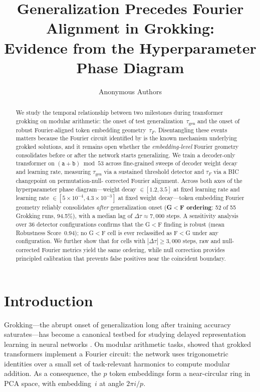 \documentclass{article}
\title{\textbf{Generalization Precedes Fourier Alignment in Grokking:\\
Evidence from the Hyperparameter Phase Diagram}}
\author{Anonymous Authors}
\date{}
\newcommand{\taug}{\tau_{\mathrm{gen}}}
\newcommand{\tauf}{\tau_{F}}
\newcommand{\Dtau}{\Delta\tau}
\begin{document}
\maketitle

\begin{abstract}
We study the temporal relationship between two milestones during
transformer grokking on modular arithmetic: the onset of test
generalization~$\taug$ and the onset of robust Fourier-aligned
token embedding geometry~$\tauf$.
Disentangling these events matters because the Fourier circuit
identified by \citet{nanda2023progress} is the known mechanism
underlying grokked solutions, and it remains open whether the
\emph{embedding-level} Fourier geometry consolidates before or
after the network starts generalizing.
We train a decoder-only transformer on $(\mathtt{a}+\mathtt{b})
\bmod 53$ across fine-grained sweeps of decoder weight decay and
learning rate, measuring $\taug$ via a sustained threshold
detector and $\tauf$ via a BIC changepoint on permutation-null-%
corrected Fourier alignment.
Across both axes of the hyperparameter phase diagram—weight decay
$\in[1.2, 3.5]$ at fixed learning rate and learning rate
$\in[5\times10^{-4}, 4.3\times10^{-3}]$ at fixed weight
decay—token embedding Fourier geometry reliably consolidates
\emph{after} generalization onset (\textbf{G$<$F ordering}:
52 of 55 Grokking runs, 94.5\%), with a median lag of
$\Dtau\approx7{,}000$ steps.
A sensitivity analysis over 36 detector configurations confirms
that the G$<$F finding is robust (mean Robustness Score~0.94);
no G$<$F cell is ever reclassified as F$<$G under any configuration.
We further show that for cells with $|\Dtau|\geq3{,}000$ steps,
raw and null-corrected Fourier metrics yield the same ordering,
while null correction provides principled calibration that prevents
false positives near the coincident boundary.
\end{abstract}

\section{Introduction}
\label{sec:intro}

Grokking---the abrupt onset of generalization long after training
accuracy saturates---has become a canonical testbed for studying
delayed representation learning in neural networks
\citep{power2022grokking}.
On modular arithmetic tasks, \citet{nanda2023progress} showed that
grokked transformers implement a Fourier circuit: the network uses
trigonometric identities over a small set of task-relevant harmonics
to compute modular addition.
As a consequence, the $p$ token embeddings form a near-circular ring
in PCA space, with embedding~$i$ at angle $2\pi i/p$.
\end{document}

